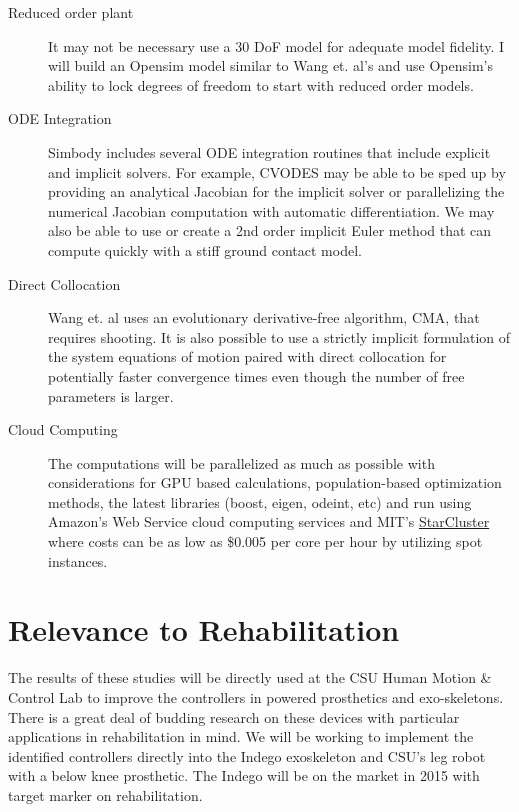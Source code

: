 \documentclass[11pt]{article}
\begin{document}
\begin{description}
  \item[Reduced order plant] It may not be necessary use a 30 DoF model
    for adequate model fidelity. I will build an Opensim model similar to Wang
    et. al's and use Opensim's ability to lock degrees of freedom to start with
    reduced order models.
  \item[ODE Integration] Simbody includes several ODE integration routines that
    include explicit and implicit solvers. For example, CVODES may be able to
    be sped up by providing an analytical Jacobian for the implicit solver or
    parallelizing the numerical Jacobian computation with automatic
    differentiation. We may also be able to use or create a 2nd order implicit
    Euler method that can compute quickly with a stiff ground contact model.
  \item[Direct Collocation] Wang et. al uses an evolutionary derivative-free
    algorithm, CMA, that requires shooting. It is also possible to use a
    strictly implicit formulation of the system equations of motion paired with
    direct collocation \cite{Ackermann2010} for potentially faster convergence
    times even though the number of free parameters is larger.
  \item[Cloud Computing] The computations will be parallelized as much as
    possible with considerations for GPU based calculations, population-based
    optimization methods, the latest libraries (boost, eigen, odeint, etc) and
    run using Amazon's Web Service cloud computing services and MIT's
    \href{http://star.mit.edu/cluster/}{StarCluster} where costs can be as low
    as \$0.005 per core per hour by utilizing spot instances.
\end{description}

\section*{Relevance to Rehabilitation}

The results of these studies will be directly used at the CSU Human Motion \&
Control Lab to improve the controllers in powered prosthetics and
exo-skeletons.  There is a great deal of budding research on these devices with
particular applications in rehabilitation in mind. We will be working to
implement the identified controllers directly into the Indego exoskeleton and
CSU's leg robot with a below knee prosthetic. The Indego will be on the market
in 2015 with target marker on rehabilitation.
\end{document}

